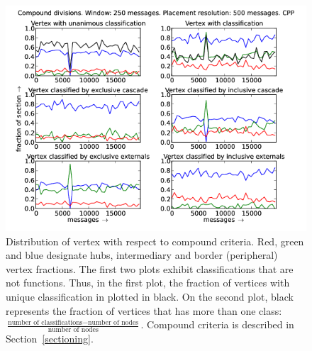 \documentclass[%
 aip,
 jmp,%
 amsmath,amssymb,
 reprint,%
]{revtex4-1}
\begin{document}
\begin{figure}[hbtp] 
   \centering
        \includegraphics[width=\textwidth]{figs/CPP/250_2}
    \caption{Distribution of vertex with respect to compound criteria. Red, green and blue designate hubs, intermediary and border (peripheral) vertex fractions. The first two plots exhibit classifications that are not functions. Thus, in the first plot, the fraction of vertices with unique classification in plotted in black. On the second plot, black represents the fraction of vertices that has more than one class: $\frac{\text{number of classifications} - \text{number of nodes}}{\text{number of nodes}}$. Compound criteria is described in Section~\ref{sectioning}.}
    \label{fig:cpp250_}
\end{figure}
\end{document}
